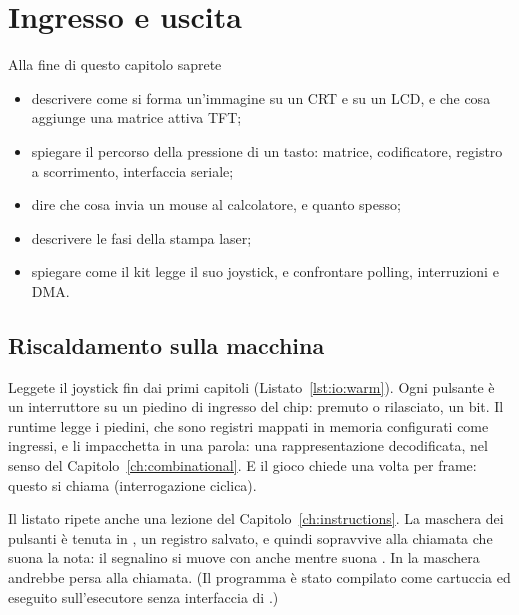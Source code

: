 \chapter{Ingresso e uscita}
\label{ch:io}


\begin{chapgoals}
Alla fine di questo capitolo saprete
\begin{itemize}
\item descrivere come si forma un'immagine su un CRT e su un LCD, e che cosa aggiunge una matrice attiva TFT;
\item spiegare il percorso della pressione di un tasto: matrice, codificatore, registro a scorrimento, interfaccia seriale;
\item dire che cosa invia un mouse al calcolatore, e quanto spesso;
\item descrivere le fasi della stampa laser;
\item spiegare come il kit \prg legge il suo joystick, e confrontare polling, interruzioni e DMA.
\end{itemize}
\end{chapgoals}


\section{Riscaldamento sulla macchina}


Leggete il joystick fin dai primi capitoli (Listato~\ref{lst:io:warm}). Ogni
pulsante è un interruttore su un piedino di ingresso del chip: premuto o
rilasciato, un bit. Il runtime legge i piedini, che sono registri mappati in
memoria configurati come ingressi, e li impacchetta in una parola: una
rappresentazione decodificata, nel senso del Capitolo~\ref{ch:combinational}.
E il gioco chiede una volta per frame: questo si chiama 
(interrogazione ciclica).

Il listato ripete anche una lezione del Capitolo~\ref{ch:instructions}. La
maschera dei pulsanti è tenuta in , un registro salvato, e quindi
sopravvive alla chiamata che suona la nota: il segnalino si muove con
 anche mentre suona . In  la maschera andrebbe persa
alla chiamata. (Il programma è stato compilato come cartuccia ed eseguito
sull'esecutore senza interfaccia di \prgqt.)

